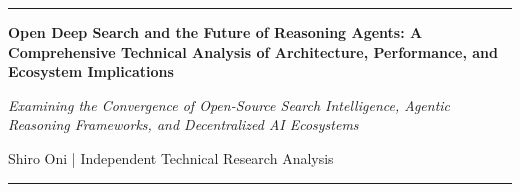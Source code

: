 \documentclass[12pt,a4paper]{article}
\newcommand{\papertitle}[1]{%
    {\LARGE\bfseries #1}%
}
\newcommand{\papersubtitle}[1]{%
    {\large\textit{#1}}%
}
\newcommand{\authorlist}[1]{%
    {\normalsize #1}%
}
\begin{document}
\thispagestyle{firstpage}

\noindent\rule{\textwidth}{0.4pt}

\vspace{1.5em}

\begin{center}
\papertitle{Open Deep Search and the Future of Reasoning Agents: A Comprehensive Technical Analysis of Architecture, Performance, and Ecosystem Implications}

\vspace{0.8em}

\papersubtitle{Examining the Convergence of Open-Source Search Intelligence, Agentic Reasoning Frameworks, and Decentralized AI Ecosystems}

\vspace{1em}

\authorlist{Shiro Oni | Independent Technical Research Analysis}

\vspace{0.1em}

\end{center}

\noindent\rule{\textwidth}{0.4pt}

\vspace{0.5em}
\end{document}
